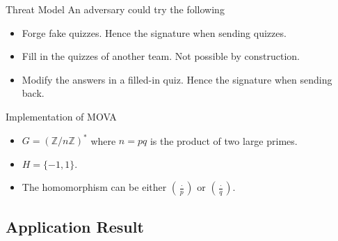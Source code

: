 \documentclass{beamer}
\newcommand{\legendre}[2]{\left(\frac{#1}{#2}\right)}
\newlength{\wideitemsep}
\let\olditem\item
\renewcommand{\item}{\setlength{\itemsep}{\wideitemsep}\olditem}
\begin{document}
\begin{frame}{Threat Model}
    An adversary could try the following
    \begin{itemize}
        \pause \item Forge fake quizzes. Hence the signature when sending quizzes. 
        \pause \item Fill in the quizzes of another team. Not possible by construction.
        \pause \item Modify the answers in a filled-in quiz. Hence the signature when sending back.
    \end{itemize}
\end{frame}

\begin{frame}{Implementation of MOVA}
    \begin{itemize}
        \pause \item $G = (\mathbb{Z}/n\mathbb{Z})^*$ where $n = pq$ is the product of two large primes.
        \pause \item $H = \{-1,1\}$.
        \pause \item The homomorphism can be either $\legendre{\cdot}{p}$ or $\legendre{\cdot}{q}$. 
    \end{itemize}
\end{frame}

\subsection{Application Result}
\end{document}
